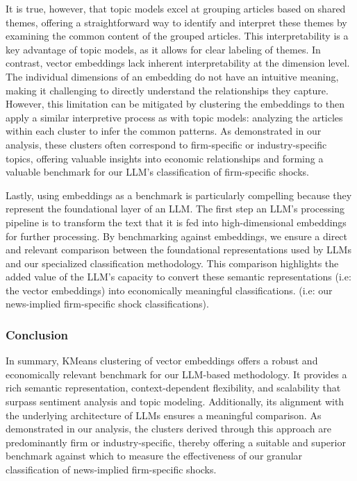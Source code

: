 
It is true, however, that topic models excel at grouping articles based on shared themes, offering a straightforward way to identify and interpret these themes by examining the common content of the grouped articles. This interpretability is a key advantage of topic models, as it allows for clear labeling of themes. In contrast, vector embeddings lack inherent interpretability at the dimension level. The individual dimensions of an embedding do not have an intuitive meaning, making it challenging to directly understand the relationships they capture. However, this limitation can be mitigated by clustering the embeddings to then apply a similar interpretive process as with topic models: analyzing the articles within each cluster to infer the common patterns. As demonstrated in our analysis, these clusters often correspond to firm-specific or industry-specific topics, offering valuable insights into economic relationships and forming a valuable benchmark for our LLM's classification of firm-specific shocks.

Lastly, using embeddings as a benchmark is particularly compelling because they represent the foundational layer of an LLM. The first step an LLM's processing pipeline is to transform the text that it is fed into high-dimensional embeddings for further processing. By benchmarking against embeddings, we ensure a direct and relevant comparison between the foundational representations used by LLMs and our specialized classification methodology. This comparison highlights the added value of the LLM's capacity to convert these semantic representations (i.e: the vector embeddings) into economically meaningful classifications. (i.e: our news-implied firm-specific shock classifications).


\subsubsection*{Conclusion}
In summary, KMeans clustering of vector embeddings offers a robust and economically relevant benchmark for our LLM-based methodology. It provides a rich semantic representation, context-dependent flexibility, and scalability that surpass sentiment analysis and topic modeling. Additionally, its alignment with the underlying architecture of LLMs ensures a meaningful comparison. As demonstrated in our analysis, the clusters derived through this approach are predominantly firm or industry-specific, thereby offering a suitable and superior benchmark against which to measure the effectiveness of our granular classification of news-implied firm-specific shocks.
